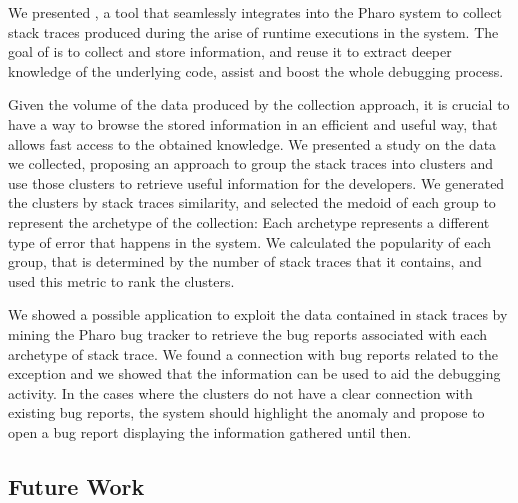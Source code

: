 We presented \shr, a tool that seamlessly integrates into the Pharo system to collect stack traces produced during the arise of runtime executions in the system.
The goal of \shr is to collect and store information, and reuse it to extract deeper knowledge of the underlying code, assist and boost the whole debugging process.

Given the volume of the data produced by the collection approach, it is crucial to have a way to browse the stored information in an efficient and useful way, that allows fast access to the obtained knowledge.
We presented a study on the data we collected, proposing an approach to group the stack traces into clusters and use those clusters to retrieve useful information for the developers.
We generated the clusters by stack traces similarity, and selected the medoid of each group to represent the archetype of the collection: Each archetype represents a different type of error that happens in the system.
We calculated the popularity of each group, that is determined by the number of stack traces that it contains, and used this metric to rank the clusters.

We showed a possible application to exploit the data contained in stack traces by mining the Pharo bug tracker to retrieve the bug reports associated with each archetype of stack trace.
We found a connection with bug reports related to the exception and we showed that the information can be used to aid the debugging activity.
In the cases where the clusters do not have a clear connection with existing bug reports, the system should highlight the anomaly and propose to open a bug report displaying the information gathered until then.

\subsection{Future Work}

